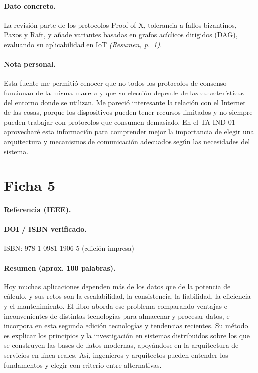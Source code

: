 \documentclass[12pt,a4paper]{article}
\begin{document}
\paragraph{Dato concreto.}
La revisión parte de los protocolos Proof-of-X, tolerancia a fallos bizantinos, Paxos y Raft, y añade variantes basadas en grafos acíclicos dirigidos (DAG), evaluando su aplicabilidad en IoT \textit{(Resumen, p.~1)}.

\paragraph{Nota personal.}
Esta fuente me permitió conocer que no todos los protocolos de consenso funcionan de la misma manera y que su elección depende de las características del entorno donde se utilizan. Me pareció interesante la relación con el Internet de las cosas, porque los dispositivos pueden tener recursos limitados y no siempre pueden trabajar con protocolos que consumen demasiado. En el TA-IND-01 aprovecharé esta información para comprender mejor la importancia de elegir una arquitectura y mecanismos de comunicación adecuados según las necesidades del sistema.

\clearpage

\section{Ficha 5}

\paragraph{Referencia (IEEE).}

\paragraph{DOI / ISBN verificado.}
ISBN: 978-1-0981-1906-5 (edición impresa)

\paragraph{Resumen (aprox. 100 palabras).}
Hoy muchas aplicaciones dependen más de los datos que de la potencia de cálculo, y sus retos son la escalabilidad, la consistencia, la fiabilidad, la eficiencia y el mantenimiento. El libro aborda ese problema comparando ventajas e inconvenientes de distintas tecnologías para almacenar y procesar datos, e incorpora en esta segunda edición tecnologías y tendencias recientes. Su método es explicar los principios y la investigación en sistemas distribuidos sobre los que se construyen las bases de datos modernas, apoyándose en la arquitectura de servicios en línea reales. Así, ingenieros y arquitectos pueden entender los fundamentos y elegir con criterio entre alternativas.
\end{document}

